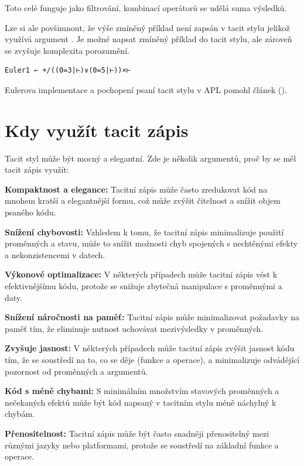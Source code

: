 \documentclass[male,czech]{kithesis}
\newcommand{\aplInline}[1]{\colorbox{gray!10}{{\apl{#1}}}}
\begin{document}
Toto celé funguje jako filtrování, 
kombinací operátorů \aplInline{+/} se udělá suma výsledků.

Lze si ale povšimnout, 
že výše zmíněný příklad není zapsán v tacit stylu jelikož využívá argument \aplInline{⍵}.
Je možné napsat zmíněný příklad do tacit stylu, 
ale zároveň se zvyšuje komplexita porozumění.
\begin{lstlisting}[language=apl,extendedchars=true]
  Euler1 ← +/((0=3|⊢)∨(0=5|⊢))×⊢
\end{lstlisting}

Eulerova implementace a 
pochopení psaní tacit stylu v APL pomohl článek (\cite{CzechApl}).

\section{Kdy využít tacit zápis}

Tacit styl může být mocný a elegantní.
Zde je několik argumentů, 
proč by se měl tacit zápis využít:

\textbf{Kompaktnost a elegance:}
Tacitní zápis může často zredukovat kód na mnohem kratší a elegantnější formu, 
což může zvýšit čitelnost a snížit objem psaného kódu.

\textbf{Snížení chybovosti:}
Vzhledem k tomu, že tacitní zápis minimalizuje použití proměnných a stavu, 
může to snížit možnosti chyb spojených s nechtěnými efekty a nekonzistencemi v datech.

\textbf{Výkonové optimalizace:}
V některých případech může tacitní zápis vést k efektivnějšímu kódu, 
protože se snižuje zbytečná manipulace s proměnnými a daty.

\textbf{Snížení náročnosti na paměť:}
Tacitní zápis může minimalizovat požadavky na paměť tím, 
že eliminuje nutnost uchovávat mezivýsledky v proměnných.

\textbf{Zvyšuje jasnost:}
V některých případech může tacitní zápis zvýšit jasnost kódu tím, 
že se soustředí na to, co se děje (funkce a operace), 
a minimalizuje odvádějící pozornost od proměnných a argumentů.

\textbf{Kód s méně chybami:}
S minimálním množstvím stavových proměnných a 
nečekaných efektů může být kód napsaný v tacitním stylu méně náchylný k chybám.

\textbf{Přenositelnost:}
Tacitní zápis může být často snadněji přenositelný mezi různými jazyky nebo platformami, 
protože se soustředí na základní funkce a operace.

\end{document}
